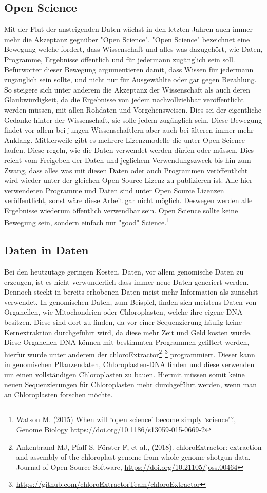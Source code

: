 \documentclass{scrartcl}
\begin{document}
\subsection{Open Science}
\label{sec-2-3}
Mit der Flut der ansteigenden Daten wächst in den letzten Jahren auch immer mehr die Akzeptanz gegnüber "Open Science".
"Open Science" bezeichnet eine Bewegung welche fordert, dass Wissenschaft und alles was dazugehört, wie Daten, Programme, Ergebnisse öffentlich und für jedermann 
zugänglich sein soll. Befürworter dieser Bewegung argumentieren damit, dass Wissen für jedermann zugänglich sein sollte, und nicht nur für Ausgewählte oder gar
gegen Bezahlung. So steigere sich unter anderem die Akzeptanz der Wissenschaft als auch deren Glaubwürdigkeit, da die Ergebnisse von jedem nachvollziehbar 
veröffentlicht werden müssen, mit allen Rohdaten und Vorgehensweisen. Dies sei der eigentliche Gedanke hinter der Wissenschaft, sie solle jedem zugänglich sein.
Diese Bewegung findet vor allem bei jungen Wissenschaftlern aber auch bei älteren immer mehr Anklang. Mittlerweile gibt es mehrere Lizenzmodelle die unter
Open Science laufen. Diese regeln, wie die Daten verwendet werden dürfen oder müssen. Dies reicht vom Freigeben der Daten und jeglichem Verwendungszweck bis hin
zum Zwang, dass alles was mit diesen Daten oder auch Programmen veröffentlicht wird wieder unter der gleichen Open Source Lizenz zu publizieren ist.
Alle hier verwendeten Programme und Daten sind unter Open Source Lizenzen veröffentlicht, sonst wäre diese Arbeit gar nicht möglich. 
Deswegen werden alle Ergebnisse wiederum öffentlich verwendbar sein. Open Science sollte keine Bewegung sein, sondern einfach nur "good" Science.\footnote{Watson M. (2015) When will ‘open science’ become simply ‘science’?, Genome Biology \url{https://doi.org/10.1186/s13059-015-0669-2}}


\subsection{Daten in Daten}
\label{sec-2-4}
Bei den heutzutage geringen Kosten, Daten, vor allem genomische Daten zu erzeugen, ist es nicht verwunderlich dass immer neue Daten generiert werden.
Dennoch steckt in bereits erhobenen Daten meist mehr Information als zunächst verwendet. In genomischen Daten, zum Beispiel, finden sich meistens Daten 
von Organellen, wie Mitochondrien oder Chloroplasten, welche ihre eigene DNA besitzen. Diese sind dort zu finden, da vor einer Sequenzierung häufig keine 
Kernextraktion durchgeführt wird, da diese mehr Zeit und Geld kosten würde. Diese Organellen DNA können mit bestimmten Programmen gefiltert werden, hierfür 
wurde unter anderem der chloroExtractor\footnote{Ankenbrand MJ, Pfaff S, Förster F, et al., (2018). chloroExtractor: extraction and assembly of the chloroplast genome from whole genome shotgun data. Journal of Open Source Software, \url{https://doi.org/10.21105/joss.00464}}\textsuperscript{,}\,\footnote{\url{https://github.com/chloroExtractorTeam/chloroExtractor}} programmiert. Dieser kann in genomischen Pflanzendaten, Chloroplasten-DNA finden und diese verwenden um einen vollständigen
Chloroplasten zu bauen. Hiermit müssen somit keine neuen Sequenzierungen für Chloroplasten mehr durchgeführt werden, wenn man an Chloroplasten forschen möchte.
\end{document}
